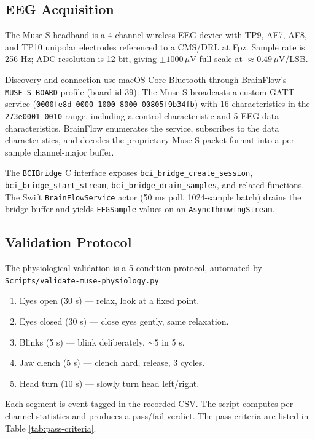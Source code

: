 \subsection{EEG Acquisition}

The Muse S headband is a 4-channel wireless EEG device with TP9, AF7, AF8, and TP10 unipolar electrodes referenced to a CMS/DRL at Fpz. Sample rate is 256 Hz; ADC resolution is 12 bit, giving $\pm 1000\,\mu$V full-scale at $\approx 0.49\,\mu$V/LSB.

Discovery and connection use macOS Core Bluetooth through BrainFlow's \texttt{MUSE\_S\_BOARD} profile (board id 39). The Muse S broadcasts a custom GATT service (\texttt{0000fe8d-0000-1000-8000-00805f9b34fb}) with 16 characteristics in the \texttt{273e0001-0010} range, including a control characteristic and 5 EEG data characteristics. BrainFlow enumerates the service, subscribes to the data characteristics, and decodes the proprietary Muse S packet format into a per-sample channel-major buffer.

The \texttt{BCIBridge} C interface exposes \texttt{bci\_bridge\_create\_session}, \texttt{bci\_bridge\_start\_stream}, \texttt{bci\_bridge\_drain\_samples}, and related functions. The Swift \texttt{BrainFlowService} actor (50 ms poll, 1024-sample batch) drains the bridge buffer and yields \texttt{EEGSample} values on an \texttt{AsyncThrowingStream}.

\subsection{Validation Protocol}

The physiological validation is a 5-condition protocol, automated by
\texttt{Scripts/validate-muse-physiology.py}:

\begin{enumerate}
\item Eyes open (30 s) — relax, look at a fixed point.
\item Eyes closed (30 s) — close eyes gently, same relaxation.
\item Blinks (5 s) — blink deliberately, $\sim 5$ in 5 s.
\item Jaw clench (5 s) — clench hard, release, 3 cycles.
\item Head turn (10 s) — slowly turn head left/right.
\end{enumerate}

Each segment is event-tagged in the recorded CSV. The script computes
per-channel statistics and produces a pass/fail verdict. The pass criteria
are listed in Table \ref{tab:pass-criteria}.

